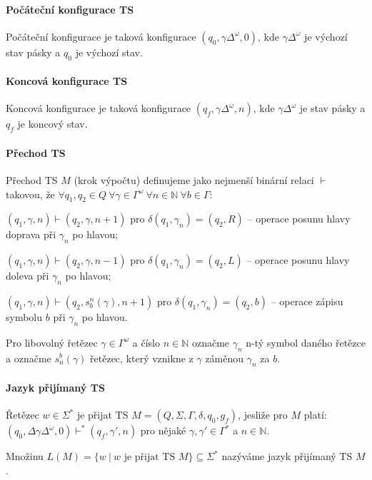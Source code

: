 \paragraph*{Počáteční konfigurace TS} Počáteční konfigurace je taková konfigurace $(q_0, \gamma \Delta^{\omega}, 0)$, kde $\gamma \Delta^{\omega}$ je výchozí stav pásky a $q_0$ je výchozí stav.

\paragraph*{Koncová konfigurace TS} Koncová konfigurace je taková konfigurace $(q_f, \gamma \Delta^{\omega}, n)$, kde $\gamma \Delta^{\omega}$ je stav pásky a $q_f$ je koncový stav.

\paragraph*{Přechod TS} Přechod TS $M$ (krok výpočtu) definujeme jako nejmenší binární relaci $\vdash$ takovou, že $\forall q_1, q_2 \in Q ~ \forall \gamma \in \Gamma^{\omega} ~ \forall n \in \mathbb{N} ~ \forall b \in \Gamma$: \begin{compactitem}
    \item $(q_1, \gamma, n) \vdash (q_2, \gamma, n + 1)$ pro $\delta(q_1, \gamma_n) = (q_2, R)$ -- operace posunu hlavy doprava při $\gamma_n$ po hlavou;

    \item $(q_1, \gamma, n) \vdash (q_2, \gamma, n - 1)$ pro $\delta(q_1, \gamma_n) = (q_2, L)$ -- operace posunu hlavy doleva při $\gamma_n$ po hlavou;

    \item $(q_1, \gamma, n) \vdash (q_2, s_b^n(\gamma), n + 1)$ pro $\delta(q_1, \gamma_n) = (q_2, b)$ -- operace zápisu symbolu $b$ při $\gamma_n$ po hlavou.
\end{compactitem}

Pro libovolný řetězec $\gamma \in \Gamma^{\omega}$ a číslo $n \in \mathbb{N}$ označme $\gamma_n$ n-tý symbol daného řetězce a označme $s_n^b(\gamma)$ řetězec, který vznikne z $\gamma$ záměnou $\gamma_n$ za $b$.

\paragraph*{Jazyk přijímaný TS} \begin{compactitem}
    \item Řetězec $w \in \Sigma^*$ je přijat TS $M = (Q, \Sigma, \Gamma, \delta, q_0, g_f)$, jesliže pro $M$ platí: $(q_0, \Delta \gamma \Delta^{\omega}, 0) \vdash^* (q_f, \gamma', n)$ pro nějaké $\gamma, \gamma' \in \Gamma^*$ a $n \in \mathbb{N}$.

    \item Množinu $L(M) = \{ w ~|~ w \text{ je přijat TS } M \} \subseteq \Sigma^*$ nazýváme jazyk přijímaný TS $M$.
\end{compactitem}

